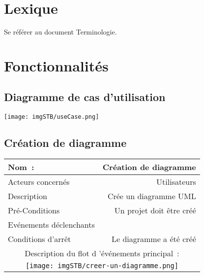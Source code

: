 \documentclass[hidelinks, 10pt,a4paper]{article}
\begin{document}
\section{Lexique}
Se référer au document Terminologie.

\section{Fonctionnalités}
\subsection{Diagramme de cas d’utilisation}
\begin{center}
    \texttt{[image: imgSTB/useCase.png]} %
\end{center}
\newpage

\subsection{Création de diagramme}
\begin{center}
    \begin{tabular}{|l|r|}
        \hline{\textbf{Nom~:}} & {\textbf{Création de diagramme}} \\\hline
        {Acteurs concernés} & {Utilisateurs} \\\hline
        {Description} & {Crée un diagramme UML} \\\hline
        {Pré-Conditions} & {Un projet doit être créé} \\\hline
        {Evénements déclenchants} & {} \\\hline
        {Conditions d’arrêt} & {Le diagramme a été créé} \\\hline
        \multicolumn{2}{|c|}{Description du flot d ’événements principal~:} \\\hline
        \multicolumn{2}{|c|}{\texttt{[image: imgSTB/creer-un-diagramme.png]}} \\\hline
    \end{tabular}
\end{center}
\newpage
\end{document}
